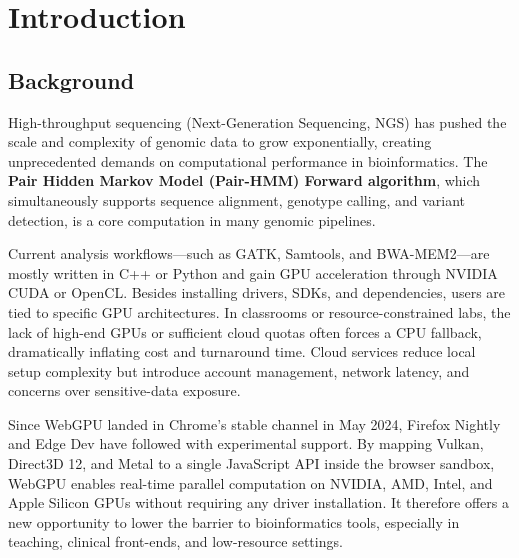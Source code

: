 \documentclass[PhD]{PHlab-thesis}
\begin{document}
\printnomenclature[5cm]

\newpage
\setcounter{page}{1}

\chapter{Introduction}
\section{Background}
High-throughput sequencing (Next-Generation Sequencing, NGS) has pushed the scale and complexity of genomic data to grow exponentially, creating unprecedented demands on computational performance in bioinformatics. The \textbf{Pair Hidden Markov Model (Pair-HMM) Forward algorithm}, which simultaneously supports sequence alignment, genotype calling, and variant detection, is a core computation in many genomic pipelines.

Current analysis workflows—such as GATK, Samtools, and BWA-MEM2—are mostly written in C++ or Python and gain GPU acceleration through NVIDIA CUDA or OpenCL. Besides installing drivers, SDKs, and dependencies, users are tied to specific GPU architectures. In classrooms or resource-constrained labs, the lack of high-end GPUs or sufficient cloud quotas often forces a CPU fallback, dramatically inflating cost and turnaround time. Cloud services reduce local setup complexity but introduce account management, network latency, and concerns over sensitive-data exposure.

Since WebGPU landed in Chrome’s stable channel in May 2024, Firefox Nightly and Edge Dev have followed with experimental support. By mapping Vulkan, Direct3D 12, and Metal to a single JavaScript API inside the browser sandbox, WebGPU enables real-time parallel computation on NVIDIA, AMD, Intel, and Apple Silicon GPUs without requiring any driver installation. It therefore offers a new opportunity to lower the barrier to bioinformatics tools, especially in teaching, clinical front-ends, and low-resource settings.
\end{document}
